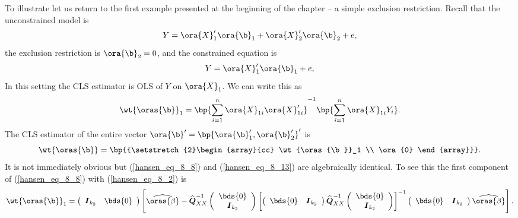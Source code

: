  To illustrate let us return to the first example presented at the beginning of the chapter -- a simple exclusion restriction. Recall that the unconstrained model is 
\begin{equation}
    \label{hansen_eq_8_10}
    Y = \ora{X}_1^\prime \ora{\b}_1 + \ora{X}_2^\prime \ora{\b}_2 + e,
\end{equation}
the exclusion restriction is $\ora{\b}_2 = 0$, and the constrained equation is 
\begin{equation}
    \label{hansen_eq_8_11}
    Y = \ora{X}_1^\prime \ora{\b}_1 + e,
\end{equation}
In this setting the CLS estimator is OLS of $Y$ on $\ora{X}_1$. We can write this as 
\begin{equation}
    \label{hansen_eq_8_12}
    \wt{\oras{\b}}_1 = \bp{\sum_{i=1}^{n} \ora{X}_{1i} \ora{X}_{1i}^\prime}^{-1} \bp{\sum_{i=1}^{n} \ora{X}_{1i} Y_i}.
\end{equation}
The CLS estimator of the entire vector $\ora{\b}^\prime = \bp{\ora{\b}_1^\prime, \ora{\b}_2^\prime}^\prime$ is 
\begin{equation}
    \label{hansen_eq_8_13}
    \wt{\oras{\b}} = \bp{{\setstretch{2}\begin{array}{cc}
        \wt{\oras{\b}}_1 \\
        \ora{0}
    \end{array}}}.
\end{equation}
It is not immediately obvious but (\ref{hansen_eq_8_8}) and (\ref{hansen_eq_8_13}) are algebraically identical. To see this the first component of (\ref{hansen_eq_8_8}) with (\ref{hansen_eq_8_2}) is 
\begin{equation}
    \notag
    \wt{\oras{\b}}_1 = \left(\begin{array}{ll}
        \boldsymbol{I}_{k_2} & \bds{0}
        \end{array}\right)\left[\widehat{\oras{\beta}}-\widehat{\boldsymbol{Q}}_{X X}^{-1}\left(\begin{array}{c}
            \bds{0} \\
        \boldsymbol{I}_{k_2}
        \end{array}\right)\left[\left(\begin{array}{ll}
            \bds{0} & \boldsymbol{I}_{k_2}
        \end{array}\right) \widehat{\boldsymbol{Q}}_{X X}^{-1}\left(\begin{array}{c}
            \bds{0} \\
        \boldsymbol{I}_{k_2}
        \end{array}\right)\right]^{-1}\left(\begin{array}{ll}
            \bds{0} & \boldsymbol{I}_{k_2}
        \end{array}\right) \widehat{\oras{\beta}}\right] .
\end{equation}
